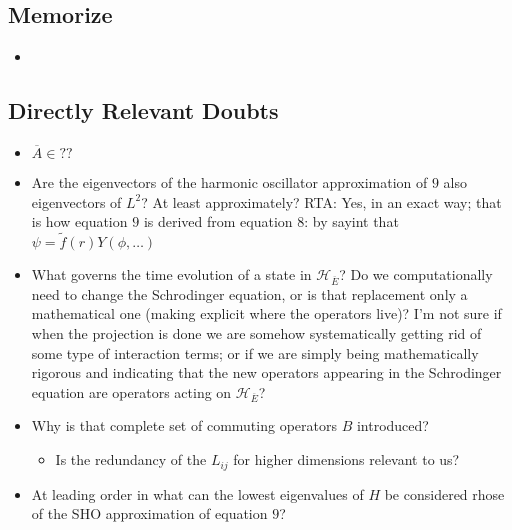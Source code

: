 \documentclass{article}
\newcommand{\cut}[1]{\overline{#1}}
\begin{document}
\subsection*{Memorize}

    \begin{itemize}

    \item 
    
    \end{itemize}

\subsection*{Directly Relevant Doubts}

    \begin{itemize}

    \item $\cut A \in ??$
    
    \item Are the eigenvectors of the harmonic oscillator approximation of $9$ also eigenvectors of $L^2$? At least approximately? RTA: Yes, in an exact way; that is how equation $9$ is derived from equation $8$: by sayint that $\psi = \tilde f(r) Y(\phi, \dots)$
    
    \item What governs the time evolution of a state in $\mathcal H_{\cut E}$? Do we computationally need to change the Schrodinger equation, or is that replacement only a mathematical one (making explicit where the operators live)? I'm not sure if when the projection is done we are somehow systematically getting rid of some type of interaction terms; or if we are simply being mathematically rigorous and indicating that the new operators appearing in the Schrodinger equation are operators acting on $\mathcal H_{\cut E}$?
    
    \item Why is that complete set of commuting operators $B$ introduced?
    
        \begin{itemize}
            
        \item Is the redundancy of the $L_{ij}$ for higher dimensions relevant to us?
            
        \end{itemize}
    
    \item At leading order in what can the lowest eigenvalues of $H$ be considered rhose of the SHO approximation of equation $9$?
    
    \end{itemize}
\end{document}
